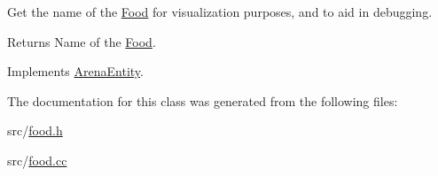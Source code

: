 Get the name of the \hyperlink{class_food}{Food} for visualization purposes, and to aid in debugging. 

\begin{DoxyReturn}{Returns}
Name of the \hyperlink{class_food}{Food}. 
\end{DoxyReturn}


Implements \hyperlink{class_arena_entity_ad43152003033cf01ad86eeff1990b69a}{Arena\+Entity}.



The documentation for this class was generated from the following files\+:\begin{DoxyCompactItemize}
\item 
src/\hyperlink{food_8h}{food.\+h}\item 
src/\hyperlink{food_8cc}{food.\+cc}\end{DoxyCompactItemize}
